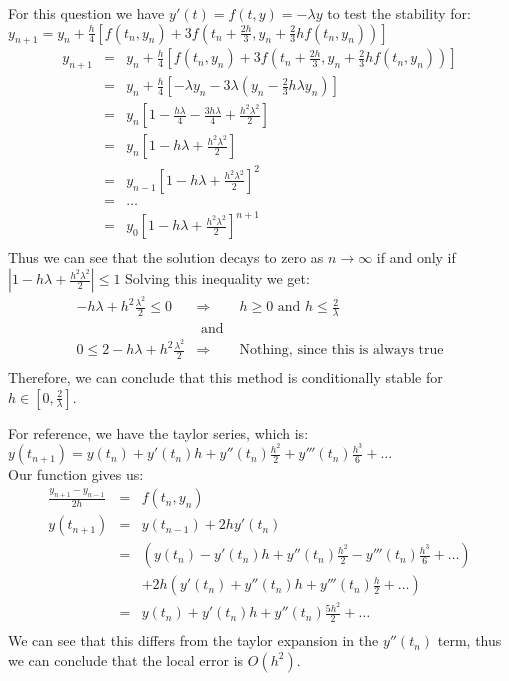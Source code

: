 \documentclass[12pt]{article}
\begin{document}
\begin{list}{.}{}
\item For this question we have $y'(t) = f(t,y) = -\lambda y$ to test the
stability for:\\
$y_{n+1} = y_n + \frac{h}{4}[f(t_n,y_n) + 3f(t_n + \frac{2h}{3},
y_n + \frac{2}{3}hf(t_n,y_n))]$
\begin{eqnarray*}
y_{n+1} &=& y_n + \frac{h}{4}\left[f(t_n,y_n) + 3f\left(t_n + \frac{2h}{3},
y_n + \frac{2}{3}hf(t_n,y_n)\right)\right]\\
&=& y_n + \frac{h}{4}\left[-\lambda y_n -3\lambda\left(y_n -
\frac{2}{3}h\lambda y_n \right) \right]\\
&=& y_n\left[1 - \frac{h\lambda}{4} - \frac{3h\lambda}{4} +
\frac{h^2\lambda^2}{2}\right]\\
&=& y_n \left[1 - h\lambda + \frac{h^2\lambda^2}{2}\right]\\
&=& y_{n-1} \left[1 - h\lambda + \frac{h^2\lambda^2}{2}\right]^2\\
&=& \dots\\
&=& y_0 \left[1 - h\lambda + \frac{h^2\lambda^2}{2}\right]^{n+1}\\
\end{eqnarray*}
\newpage
Thus we can see that the solution decays to zero as $n \rightarrow \infty$ if
and only if $|1 - h\lambda + \frac{h^2\lambda^2}{2}| \le 1$
Solving this inequality we get:
\begin{eqnarray*}
-h\lambda + h^2\frac{\lambda^2}{2} \le 0 &\Rightarrow& 
h \ge 0 \textrm{ and } h \le \frac{2}{\lambda} \\
&\textrm{ and }&\\
0 \le 2-h\lambda + h^2\frac{\lambda^2}{2} &\Rightarrow& 
\textrm{Nothing, since this is always true}\\
\end{eqnarray*}
Therefore, we can conclude that this method is conditionally stable for $h \in
\left[0, \frac{2}{\lambda}\right]$.

\item 
\begin{list}{)}{}

\item For reference, we have the taylor series, which is:\\
$y(t_{n+1}) = y(t_n) + y'(t_n)h + y''(t_n)\frac{h^2}{2} +
y'''(t_n)\frac{h^3}{6} + \dots$\\
Our function gives us:
\begin{eqnarray*}
\frac{y_{n+1} - y_{n-1}}{2h} &=& f(t_n,y_n)\\
y(t_{n+1}) &=& y(t_{n-1}) + 2hy'(t_n)\\
&=& \left(y(t_n) - y'(t_n)h + y''(t_n)\frac{h^2}{2} - y'''(t_n)\frac{h^3}{6} +
\dots\right)\\
&& + 2h\left(y'(t_n) + y''(t_n)h + y'''(t_n)\frac{h}{2} + \dots\right)\\
&=& y(t_n) + y'(t_n)h + y''(t_n)\frac{5h^2}{2} + \dots\\
\end{eqnarray*}
We can see that this differs from the taylor expansion in the $y''(t_n)$ term,
thus we can conclude that the local error is $O(h^2)$.


\end{list}
\end{list}
\end{document}
